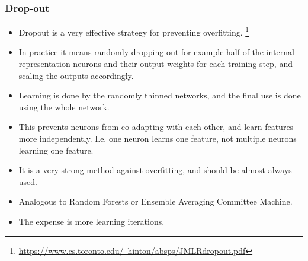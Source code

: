 \documentclass[8pt]{beamer}
\begin{document}
\begin{frame}
\frametitle{Drop-out}
 \begin{itemize}
  \item Dropout is a very effective strategy for preventing overfitting.
        \footnote{\href{https://www.cs.toronto.edu/~hinton/absps/JMLRdropout.pdf}{https://www.cs.toronto.edu/~hinton/absps/JMLRdropout.pdf}}
  \item In practice it means randomly dropping out for example half of the internal representation neurons and their output weights for each
        training step, and scaling the outputs accordingly.
  \item Learning is done by the randomly thinned networks, and the final use is done using the whole network.
  \item This prevents neurons from co-adapting with each other, and learn features more independently. I.e. one neuron learns one feature,
        not multiple neurons learning one feature.
  \item It is a very strong method against overfitting, and should be almost always used.
  \item Analogous to Random Forests or Ensemble Averaging Committee Machine.
  \item The expense is more learning iterations.
 \end{itemize}
\end{frame}
\end{document}

